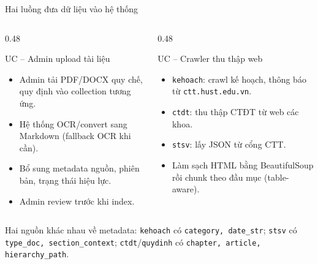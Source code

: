 \documentclass[t, aspectratio=169]{beamer}
\begin{document}
	\begin{frame}{Hai luồng đưa dữ liệu vào hệ thống}
		\begin{columns}[T,onlytextwidth]
			\begin{column}{0.48\textwidth}
				\begin{block}{UC -- Admin upload tài liệu}
					\begin{itemize}
						\item Admin tải PDF/DOCX quy chế, quy định vào collection tương ứng.
						\item Hệ thống OCR/convert sang Markdown (fallback OCR khi cần).
						\item Bổ sung metadata nguồn, phiên bản, trạng thái hiệu lực.
						\item Admin review trước khi index.
					\end{itemize}
				\end{block}
			\end{column}
			\begin{column}{0.48\textwidth}
				\begin{block}{UC -- Crawler thu thập web}
					\begin{itemize}
						\item \texttt{kehoach}: crawl kế hoạch, thông báo từ \texttt{ctt.hust.edu.vn}.
						\item \texttt{ctdt}: thu thập CTĐT từ web các khoa.
						\item \texttt{stsv}: lấy JSON từ cổng CTT.
						\item Làm sạch HTML bằng BeautifulSoup rồi chunk theo đầu mục (table-aware).
					\end{itemize}
				\end{block}
			\end{column}
		\end{columns}

		\vspace{0.2cm}
		\centering
		\scriptsize Hai nguồn khác nhau về metadata: \texttt{kehoach} có \texttt{category, date\_str}; \texttt{stsv} có \texttt{type\_doc, section\_context}; \texttt{ctdt}/\texttt{quydinh} có \texttt{chapter, article, hierarchy\_path}.
	\end{frame}
\end{document}
